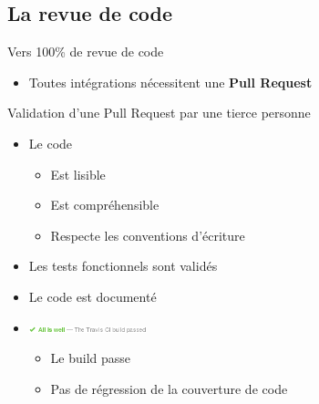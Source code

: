 		\subsection{La revue de code}
		\begin{frame}{Vers 100\% de revue de code}
			\begin{itemize}
				\item Toutes intégrations nécessitent une \textbf{Pull Request}
			\end{itemize}
			\vfill
			\pause
			\begin{block}{\normalsize Validation d'une Pull Request par une tierce personne}
				\begin{itemize}
					\item Le code
						\begin{itemize}
							\item Est lisible
							\item Est compréhensible
							\item Respecte les conventions d'écriture
						\end{itemize}
					\item Les tests fonctionnels sont validés
					\item Le code est documenté
					\item \includegraphics[height=7px]{images/all_is_well.png}
						\begin{itemize}
							\item Le build passe
							\item Pas de régression de la couverture de code
						\end{itemize}
				\end{itemize}
			\end{block}	
		\end{frame}
